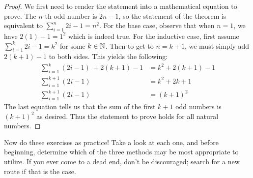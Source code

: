 \vspace{-4mm}
\begin{proof}
    We first need to render the statement into a mathematical equation to prove. The $n$-th odd number is $2n-1$, so the statement of the theorem is equivalent to $\sum_{i=1}^n 2i-1 = n^2$. For the base case, observe that when $n=1$, we have $2(1)-1 = 1^2$ which is indeed true. For the inductive case, first assume $\sum_{i=1}^k 2i-1 = k^2$ for some $k\in\mathbb{N}$. Then to get to $n=k+1$, we must simply add $2(k+1)-1$ to both sides. This yields the following:
    \begin{align*}
        \sum_{i=1}^{k} (2i-1)\ + 2(k+1)-1 &= k^2 + 2(k+1)-1 \\
        \sum_{i=1}^{k+1} (2i-1) &= k^2 + 2k + 1 \\
        \sum_{i=1}^{k+1} (2i-1) &= (k+1)^2
    \end{align*}
    The last equation tells us that the sum of the first $k+1$ odd numbers is $(k+1)^2$ as desired. Thus the statement to prove holds for all natural numbers. 
\end{proof}

Now do these exercises as practice! Take a look at each one, and before beginning, determine which of the three methods may be most appropriate to utilize. If you ever come to a dead end, don't be discouraged; search for a new route if that is the case.

